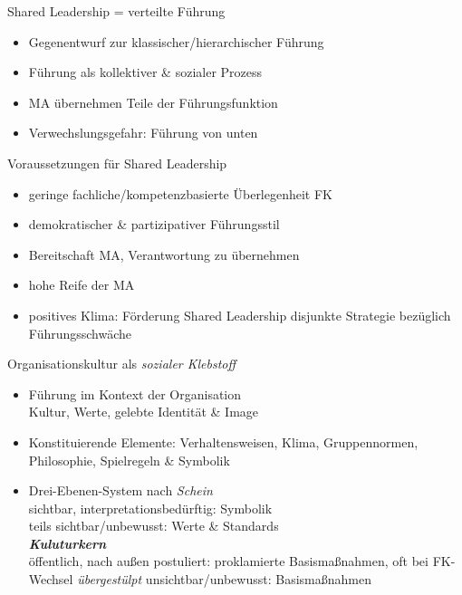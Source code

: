 \documentclass{cheatsheet}
\begin{document}
    \begin{sectionbox}{Shared Leadership = verteilte Führung}
        \begin{itemize}
            \item Gegenentwurf zur klassischer/hierarchischer Führung
            \item Führung als kollektiver \& sozialer Prozess
            \item MA übernehmen Teile der Führungsfunktion
            \item Verwechslungsgefahr: Führung von unten
        \end{itemize}
    \end{sectionbox}
    \begin{hintbox}{Voraussetzungen für Shared Leadership}
        \begin{itemize}
            \item geringe fachliche/kompetenzbasierte Überlegenheit FK
            \item demokratischer \& partizipativer Führungsstil
            \item Bereitschaft MA, Verantwortung zu übernehmen
            \item hohe Reife der MA
            \item positives Klima: Förderung Shared Leadership 
            \ra disjunkte Strategie bezüglich Führungsschwäche
        \end{itemize}
    \end{hintbox}
    \begin{sectionbox}{Organisationskultur als \emph{sozialer Klebstoff}}
        \begin{itemize}
            \item Führung im Kontext der Organisation\\
            \ra Kultur, Werte, gelebte Identität \& Image
            \item Konstituierende Elemente: Verhaltensweisen, Klima, Gruppennormen, Philosophie, Spielregeln \& Symbolik
            \item Drei-Ebenen-System nach \emph{Schein} \\
            \ra sichtbar, interpretationsbedürftig: Symbolik\\
            \ra teils sichtbar/unbewusst: Werte \& Standards\\
            \textbf{\emph{Kuluturkern}}\\
            \ra öffentlich, nach außen postuliert: proklamierte Basismaßnahmen, oft bei FK-Wechsel \emph{übergestülpt}
            \ra unsichtbar/unbewusst: Basismaßnahmen
        \end{itemize}
    \end{sectionbox}
\end{document}
